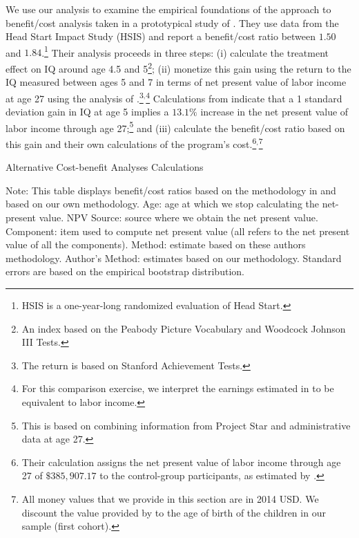 We use our analysis to examine the empirical foundations of the approach to benefit/cost analysis taken in a prototypical study of \citet{Kline_Walters_2016_QJE}. They use data from the Head Start Impact Study (HSIS) and report a benefit/cost ratio between $1.50$ and $1.84$.\footnote{HSIS is a one-year-long randomized evaluation of Head Start.} Their analysis proceeds in three steps: (i) calculate the treatment effect on IQ around age 4.5 and 5\footnote{An index based on the Peabody Picture Vocabulary and Woodcock Johnson III Tests.}; (ii) monetize this gain using the return to the IQ measured between ages 5 and 7 in terms of net present value of labor income at age 27 using the analysis of \citet{Chetty_Friedman_etal_2011_QJoE}.\footnote{The \citet{Chetty_Friedman_etal_2011_QJoE} return is based on Stanford Achievement Tests.}$^,$\footnote{For this comparison exercise, we interpret the earnings estimated in \citet{Chetty_Friedman_etal_2011_QJoE} to be equivalent to labor income.} Calculations from \citet{Chetty_Friedman_etal_2011_QJoE} indicate that a 1 standard deviation gain in IQ at age 5 implies a $13.1\%$ increase in the net present value of labor income through age 27;\footnote{This is based on combining information from Project Star and administrative data at age 27.} and (iii) calculate the benefit/cost ratio based on this gain and their own calculations of the program's cost.\footnote{Their calculation assigns the net present value of labor income through age 27 of $\$385,907.17$ to the control-group participants, as estimated by  \citet{Chetty_Friedman_etal_2011_QJoE}.}$^,$\footnote{All money values that we provide in this section are in 2014 USD. We discount the value provided by \citet{Chetty_Friedman_etal_2011_QJoE} to the age of birth of the children in our sample (first cohort).}


\begin{table}[!htbp]
\begin{threeparttable}
\caption{Alternative Cost-benefit Analyses Calculations}
\label{table:comparing}
\centering
\footnotesize

\begin{tablenotes}
\footnotesize
\item Note: This table displays benefit/cost ratios based on the methodology in \citet{Kline_Walters_2016_QJE} and based on our own methodology. Age: age at which we stop calculating the net-present value. NPV Source: source where we obtain the net present value. Component: item used to compute net present value (all refers to the net present value of all the components). \citet{Kline_Walters_2016_QJE} Method: estimate based on these authors methodology. Author's Method: estimates based on our methodology. Standard errors are based on the empirical bootstrap distribution.
\end{tablenotes}
\end{threeparttable}
\end{table}


